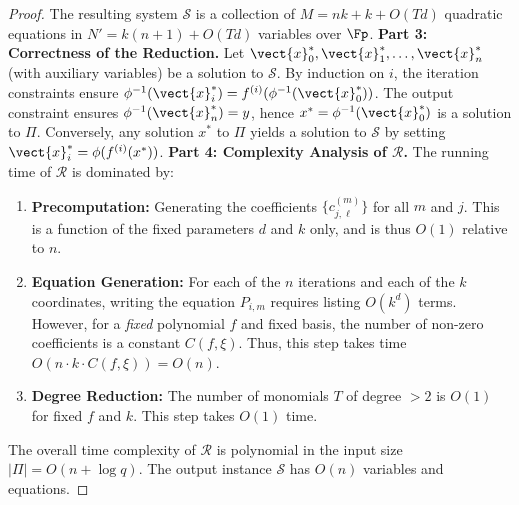 \begin{proof}
                    The resulting system $\mathcal{S}$ is a collection of $M = nk + k + O(Td)$ quadratic equations in $N' = k(n+1) + O(Td)$ variables over $\Fp$.
                \textbf{Part 3: Correctness of the Reduction.}
                    Let $\vect{x}_0^*, \vect{x}_1^*, \ldots, \vect{x}_n^*$ (with auxiliary variables) be a solution to $\mathcal{S}$. By induction on $i$, the iteration constraints ensure $\phi^{-1}(\vect{x}_i^*) = f^{(i)}(\phi^{-1}(\vect{x}_0^*))$. The output constraint ensures $\phi^{-1}(\vect{x}_n^*) = y$, hence $x^* = \phi^{-1}(\vect{x}_0^*)$ is a solution to $\Pi$. Conversely, any solution $x^*$ to $\Pi$ yields a solution to $\mathcal{S}$ by setting $\vect{x}_i^* = \phi(f^{(i)}(x^*))$.
                \textbf{Part 4: Complexity Analysis of $\mathcal{R}$.}
                    The running time of $\mathcal{R}$ is dominated by:
                    \begin{enumerate}
                        \item \textbf{Precomputation:} Generating the coefficients $\{c_{j, \boldsymbol{\ell}}^{(m)}\}$ for all $m$ and $j$. This is a function of the fixed parameters $d$ and $k$ only, and is thus $O(1)$ relative to $n$.
                        \item \textbf{Equation Generation:} For each of the $n$ iterations and each of the $k$ coordinates, writing the equation $P_{i,m}$ requires listing $O(k^d)$ terms. However, for a \textit{fixed} polynomial $f$ and fixed basis, the number of non-zero coefficients is a constant $C(f, \xi)$. Thus, this step takes time $O(n \cdot k \cdot C(f, \xi)) = O(n)$.
                        \item \textbf{Degree Reduction:} The number of monomials $T$ of degree $>2$ is $O(1)$ for fixed $f$ and $k$. This step takes $O(1)$ time.
                    \end{enumerate}
                    The overall time complexity of $\mathcal{R}$ is polynomial in the input size $|\Pi| = O(n + \log q)$. The output instance $\mathcal{S}$ has $O(n)$ variables and equations.
            \end{proof}


